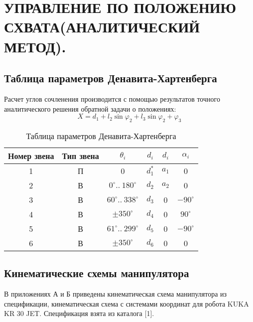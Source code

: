 \chapter{\MakeUppercase{Управление по положению схвата(аналитический метод). }}
\section{Таблица параметров Денавита-Хартенберга}
Расчет углов сочленения производится с помощью результатов точного аналитического решения обратной задачи о положениях:
\[ X=d_1+l_2\sin\varphi_2+l_3\sin{\varphi_2+\varphi_3}
    \]

\begin{table}[ht]
    \caption{Таблица параметров Денавита-Хартенберга}
    \label{table_dh}
    \centering
    \begin{tabular}{|c|c|c|c|c|c|}
    \hline Номер звена & Тип звена & $ \theta_i $ & $ d_i $ & $ d_i $ & $ \alpha_i $ \\
    \hline 1 & П & 0                            & $ d_{1}^{*} $ & $ a_1 $ & 0  \\
    \hline 2 & В & $ 0^\circ ..\: 180^\circ $   & $ d_2 $ & $ a_2 $ & 0 \\
    \hline 3 & В & $ 60^\circ ..\: 338^\circ $  & $ d_3 $ & 0 & $ -90^\circ $ \\
    \hline 4 & В & $ \pm 350^\circ $            & $ d_4 $ & 0 & $ 90^\circ $ \\
    \hline 5 & В & $ 61^\circ ..\: 299^\circ $  & $ d_5 $ & 0 & $ -90^\circ $ \\
    \hline 6 & В & $ \pm 350^\circ $            & $ d_6 $ & 0 & 0 \\
    \hline
    \end{tabular}
\end{table}

\section{Кинематические схемы манипулятора}

В приложениях А и Б приведены кинематическая схема манипулятора из спецификации, кинематическая схема с системами координат для робота KUKA KR 30 JET. Спецификация взята из каталога [1]. %

